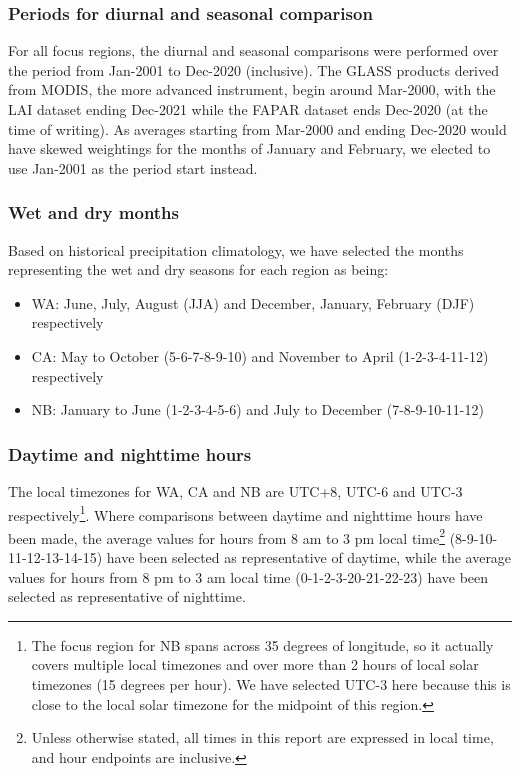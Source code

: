 \subsubsection{Periods for diurnal and seasonal comparison}

For all focus regions, the diurnal and seasonal comparisons were performed over the period from Jan-2001 to Dec-2020 (inclusive). The GLASS products derived from \ac{MODIS}, the more advanced instrument, begin around Mar-2000, with the \ac{LAI} dataset ending Dec-2021 while the \ac{FAPAR} dataset ends Dec-2020 (at the time of writing). As averages starting from Mar-2000 and ending Dec-2020 would have skewed weightings for the months of January and February, we elected to use Jan-2001 as the period start instead.

\subsubsection{Wet and dry months}

Based on historical precipitation climatology, we have selected the months representing the wet and dry seasons for each region as being:
\begin{itemize}
	\item \ac{WA}: June, July, August (JJA) and December, January, February (DJF) respectively
	\item \ac{CA}: May to October (5-6-7-8-9-10) and November to April (1-2-3-4-11-12) respectively
	\item \ac{NB}: January to June (1-2-3-4-5-6) and July to December (7-8-9-10-11-12)
\end{itemize}

\subsubsection{Daytime and nighttime hours}

The local timezones for \ac{WA}, \ac{CA} and \ac{NB} are UTC+8, UTC-6 and UTC-3 respectively\footnote{The focus region for \ac{NB} spans across 35 degrees of longitude, so it actually covers multiple local timezones and over more than 2 hours of local solar timezones (15 degrees per hour). We have selected UTC-3 here because this is close to the local solar timezone for the midpoint of this region.}. Where comparisons between daytime and nighttime hours have been made, the average values for hours from 8 am to 3 pm local time\footnote{Unless otherwise stated, all times in this report are expressed in local time, and hour endpoints are inclusive.} (8-9-10-11-12-13-14-15) have been selected as representative of daytime, while the average values for hours from 8 pm to 3 am local time (0-1-2-3-20-21-22-23) have been selected as representative of nighttime.


